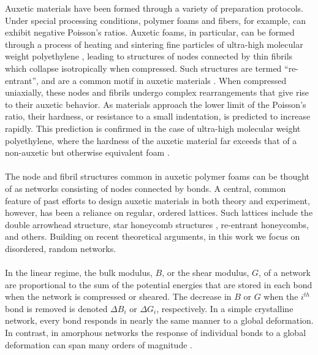 \documentclass[9pt,twocolumn,twoside]{pnas-new}
\begin{document}
Auxetic materials have been formed through a variety of preparation protocols.  Under special processing conditions, polymer foams and fibers, for example, can exhibit negative Poisson's ratios\cite{lakes1987foam, caddock1989microporous, chan1997fabrication, ravirala2006negative, alderson1994auxetic}.
Auxetic foams, in particular, can be formed through a process of heating and sintering fine particles of ultra-high molecular weight polyethylene \cite{lakes1987foam, pickles1995effect}, leading to structures of nodes connected by thin fibrils which collapse isotropically when compressed.  Such structures are termed ``re-entrant'', and are a common motif in auxetic materials \cite{lakes1987foam, chan1997microscopic}. When compressed uniaxially, these nodes and fibrils undergo complex rearrangements that give rise to their auxetic behavior. As materials approach the lower limit of the Poisson's ratio, their hardness, or resistance to a small indentation, is predicted to increase rapidly\cite{timoshenkotheory}.  This prediction is confirmed in the case of ultra-high molecular weight polyethylene, where the hardness of the auxetic material far exceeds that of a non-auxetic but otherwise equivalent foam \cite {alderson1994auxetic}.
\paragraph{}

The node and fibril structures common in auxetic polymer foams can be thought of as networks consisting of nodes connected by bonds.  A central, common feature of past efforts to design auxetic materials in both theory and experiment, however, has been a reliance on regular, ordered lattices.
Such lattices include the double arrowhead structure\cite{larsen1997design, alderson2012auxetic}, star honeycomb structures \cite{theocaris1997negative}, re-entrant honeycombs\cite{gibson1982mechanics, warren1990negative}, and others\cite{florijn2014programmable}.  Building on recent theoretical arguments\cite{goodrich2015principle,hexner2017role,hexner2017linking}, in this work we focus on disordered, random networks.
\paragraph{}



In the linear regime, the bulk modulus, $B$, or the shear modulus, $G$, of a network are proportional to the sum of the potential energies that are stored in each bond when the network is compressed or sheared.  The decrease in $B$ or $G$ when the $i^{th}$ bond is removed is denoted $\Delta B_{i}$ or $\Delta G_{i}$, respectively.  In a simple crystalline network, every bond responds in nearly the same manner to a global deformation.  In contrast, in amorphous networks the response of individual bonds to a global deformation can span many orders of magnitude \cite{goodrich2015principle,hexner2017linking}.
\end{document}
